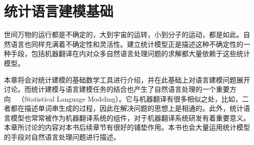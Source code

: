 
%


\renewcommand\figurename{图}%
\renewcommand\tablename{表}%


\chapter{统计语言建模基础}

\parinterval 世间万物的运行都是不确定的，大到宇宙的运转，小到分子的运动，都是如此。自然语言也同样充满着不确定性和灵活性。建立统计模型正是描述这种不确定性的一种手段，包括机器翻译在内对众多自然语言处理问题的求解都大量依赖于这些统计模型。

\parinterval 本章将会对统计建模的基础数学工具进行介绍，并在此基础上对语言建模问题展开讨论。而统计建模与语言建模任务的结合也产生了自然语言处理的一个重要方向\ \dash\ {\small{}}（Statistical Language Modeling）。它与机器翻译有很多相似之处，比如，二者都在描述单词串生成的过程，因此在解决问题的思想上是相通的。此外，统计语言模型也常常被作为机器翻译系统的组件，对于机器翻译系统研发有着重要意义。本章所讨论的内容对本书后续章节有很好的铺垫作用。本书也会大量运用统计模型的手段对自然语言处理问题进行描述。


\sectionnewpage
